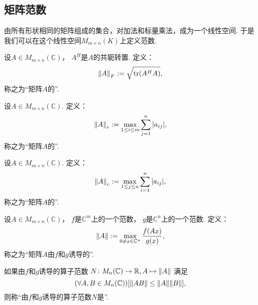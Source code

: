\subsection{矩阵范数}
由所有形状相同的矩阵组成的集合，对加法和标量乘法，成为一个线性空间.
于是我们可以在这个线性空间\(M_{m \times n}(K)\)上定义范数.

\begin{definition}
设\(A \in M_{m \times n}(\mathbb{C})\)，
\(A^H\)是\(A\)的共轭转置.
定义：\begin{equation}
	\norm{A}_F
	:=
	\sqrt{
		\tr(A^H A)
	},
\end{equation}
称之为“矩阵\(A\)的”.
\end{definition}

\begin{definition}
设\(A \in M_{m \times n}(\mathbb{C})\).
定义：\begin{equation}
	\norm{A}_r
	:=
	\max_{1 \leq i \leq m} \sum_{j=1}^n \abs{a_{ij}},
\end{equation}
称之为“矩阵\(A\)的”.
\end{definition}

\begin{definition}
设\(A \in M_{m \times n}(\mathbb{C})\).
定义：\begin{equation}
	\norm{A}_c
	:=
	\max_{1 \leq j \leq n} \sum_{i=1}^n \abs{a_{ij}},
\end{equation}
称之为“矩阵\(A\)的”.
\end{definition}

\begin{definition}
设\(A \in M_{m \times n}(\mathbb{C})\)，
\(f\)是\(\mathbb{C}^m\)上的一个范数，
\(g\)是\(\mathbb{C}^n\)上的一个范数.
定义：\begin{equation}
	\norm{A}
	:=
	\max_{0 \neq x \in \mathbb{C}^n} \frac{f(Ax)}{g(x)},
\end{equation}
称之为“矩阵\(A\)由\(f\)和\(g\)诱导的”.
\end{definition}

\begin{definition}
如果由\(f\)和\(g\)诱导的算子范数
\(N\colon M_n(\mathbb{C}) \to \mathbb{R}, A \mapsto \norm{A}\)
满足\begin{equation*}
	(\forall A,B \in M_n(\mathbb{C}))
	[
		\norm{AB}
		\leq \norm{A} \norm{B}
	],
\end{equation*}
则称“由\(f\)和\(g\)诱导的算子范数\(N\)是”.
\end{definition}

